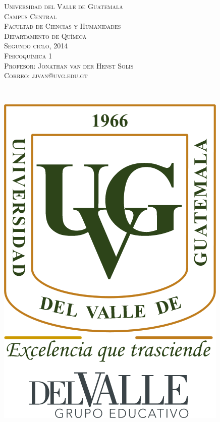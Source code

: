 \documentclass[a4paper,12pt]{article}
\begin{document}
\newcommand{\HRule}{\rule{\linewidth}{0.4mm}} %


\begin{minipage}{0.7\textwidth}
\begin{flushleft} 
\textsc{Universidad del Valle de Guatemala \\
Campus Central \\
Facultad de Ciencias y Humanidades \\
Departamento de Qu\'imica \\
Segundo ciclo, 2014 \\
Fisicoqu\'imica 1 \\
Profesor: Jonathan van der Henst Solis \\
Correo: jjvan@uvg.edu.gt
}
\end{flushleft}
\end{minipage}
~
\begin{minipage}{0.2\textwidth}
\begin{flushright}
\includegraphics[scale=0.4]{Logo_UVG} %
\end{flushright}
\end{minipage}\\
\end{document}
